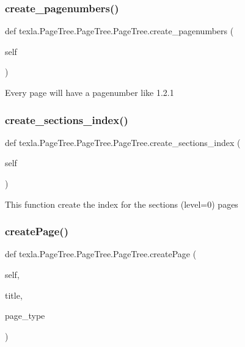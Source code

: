 \subsubsection{\texorpdfstring{create\+\_\+pagenumbers()}{create\_pagenumbers()}}
{\footnotesize\ttfamily def texla.\+Page\+Tree.\+Page\+Tree.\+Page\+Tree.\+create\+\_\+pagenumbers (\begin{DoxyParamCaption}\item[{}]{self }\end{DoxyParamCaption})}

\begin{DoxyVerb}Every page will have a pagenumber like 1.2.1\end{DoxyVerb}
 \hypertarget{classtexla_1_1PageTree_1_1PageTree_1_1PageTree_a3ff84eeb07714017d2048fe7a92be982}{}\label{classtexla_1_1PageTree_1_1PageTree_1_1PageTree_a3ff84eeb07714017d2048fe7a92be982} 
\subsubsection{\texorpdfstring{create\+\_\+sections\+\_\+index()}{create\_sections\_index()}}
{\footnotesize\ttfamily def texla.\+Page\+Tree.\+Page\+Tree.\+Page\+Tree.\+create\+\_\+sections\+\_\+index (\begin{DoxyParamCaption}\item[{}]{self }\end{DoxyParamCaption})}

\begin{DoxyVerb}This function create the index for the
sections (level=0) pages\end{DoxyVerb}
 \hypertarget{classtexla_1_1PageTree_1_1PageTree_1_1PageTree_a9df0c1cd2ebc4c0e0af693c49c084324}{}\label{classtexla_1_1PageTree_1_1PageTree_1_1PageTree_a9df0c1cd2ebc4c0e0af693c49c084324} 
\subsubsection{\texorpdfstring{create\+Page()}{createPage()}}
{\footnotesize\ttfamily def texla.\+Page\+Tree.\+Page\+Tree.\+Page\+Tree.\+create\+Page (\begin{DoxyParamCaption}\item[{}]{self,  }\item[{}]{title,  }\item[{}]{page\+\_\+type }\end{DoxyParamCaption})}

